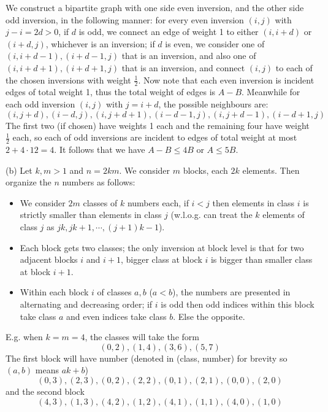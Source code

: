 \documentclass[11pt,a4paper]{article}
\begin{document}
\begin{enumerate}
        We construct a bipartite graph with one side even inversion, 
        and the other side odd inversion, in the following manner:
        for every even inversion $(i, j)$ with $j - i = 2d > 0$, 
        if $d$ is odd, 
        we connect an edge of weight 1 to either $(i, i + d)$ or $(i + d, j)$, whichever is an inversion; 
        if $d$ is even, 
        we consider one of $(i, i + d - 1), (i + d - 1, j)$ that is an inversion,
        and also one of $(i, i + d + 1), (i + d + 1, j)$ that is an inversion, 
        and connect $(i, j)$ to each of the chosen inversions with weight $\frac 12$. 
        Now note that each even inversion is incident edges of total weight 1, thus the total weight of edges is $A - B$. 
        Meanwhile for each odd inversion $(i, j)$ with $j = i + d$, the possible neighbours are: 
        \[
        (i, j + d), (i - d, j), (i, j + d + 1), (i - d - 1, j), 
        (i, j + d - 1), (i - d + 1, j)
        \]
        The first two (if chosen) have weights 1 each and the remaining four have weight $\frac 12$ each, 
        so each of odd inversions are incident to edges of total weight at most $2 + 4\cdot 12 = 4$. 
        It follows that we have $A - B \le 4B$ or $A\le 5B$. 
        
        (b) Let $k, m > 1$ and $n = 2km$. 
        We consider $m$ blocks, each $2k$ elements. 
        Then organize the $n$ numbers as follows: 
        \begin{itemize}
        	\item We consider $2m$ classes of $k$ numbers each, 
        	if $i < j$ then elements in class $i$ is strictly smaller than elements in class $j$ 
        	(w.l.o.g. can treat the $k$ elements of class $j$ as $jk, jk + 1, \cdots, (j+1)k-1$). 
        	
        	\item Each block gets two classes; the only inversion at block level is that for two adjacent blocks $i$ and $i + 1$, 
        	bigger class at block $i$ is bigger than smaller class at block $i + 1$. 
        	
        	\item Within each block $i$ of classes $a, b$ ($a < b$), 
        	the numbers are presented in alternating and decreasing order; 
        	if $i$ is odd then odd indices within this block take class $a$ and even indices take class $b$. 
        	Else the opposite. 
        \end{itemize}
        E.g. when $k = m = 4$, the classes will take the form 
        \[
        (0, 2), (1, 4), (3, 6), (5, 7)
        \]
        The first block will have number (denoted in (class, number) for brevity so $(a, b)$ means $ak + b$)
        \[
        (0, 3), (2, 3), (0, 2), (2, 2), (0, 1), (2, 1), (0, 0), (2, 0)
        \]
        and the second block 
        \[
        (4, 3), (1, 3), (4, 2), (1, 2), (4, 1), (1, 1), (4, 0), (1, 0)
        \]
        

\end{enumerate}
\end{document}
